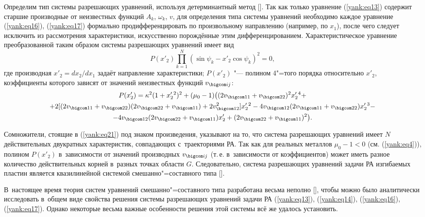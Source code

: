 Определим тип системы разрешающих уравнений, используя детерминантный метод []. 
Так как только уравнение (\ref{yank:eq13}) содержит старшие производные от неизвестных функций $A_k $, $\omega_k  $, $v$,  для определения типа системы уравнений необходимо каждое уравнение (\ref{yank:eq16}), (\ref{yank:eq17}) формально продифференцировать по произвольному направлению (например, по $x_1 $), после чего следует исключить из рассмотрения характеристики, искусственно порождённые этим дифференцированием. 
Характеристическое уравнение преобразованной таким образом системы разрешающих уравнений имеет вид
\begin{equation} \label{yank:eq21}
P( x'_2   )\prod\limits_{k=1}^N ( \sin \psi_k -x'_2  \cos \psi_k   )^2 =0,
\end{equation}
где производная $x'_2 =dx_2 /dx_1 $ задаёт направление характеристики; $P(x'_2 )$ "--- полином 4"=того порядка относительно $x'_2 $, коэффициенты которого зависят от значений неизвестных функций $v_{\bigcom ij}$:
\begin{multline} \label{yank:eq22}
P(x'_2 )=\kappa^2 (1+x'_2{} ^2)^2 +(\mu_0 -1)\bigl((2v_{\bigcom 11}+v_{\bigcom 22})^2 x'_2{}^4+ \\
+ 
2[(2v_{\bigcom 11}+v_{\bigcom 22}) (2v_{\bigcom 22}+v_{\bigcom 11})+2v_{\bigcom 12}^2 ]x'_2{}^2-4v_{\bigcom 12}(2v_{\bigcom 11}+v_{\bigcom 22})x'_2{} ^3-\\ - 4v_{\bigcom 12}(2v_{\bigcom 22}+v_{\bigcom 11})x'_{2}
+(2v_{\bigcom 22} +v_{\bigcom 11})^2 \bigr).
\end{multline}

Сомножители, стоящие в (\ref{yank:eq21}) под знаком произведения, указывают на то, что система разрешающих уравнений имеет $N$ действительных двукратных характеристик, совпадающих с~траекториями РА. 
Так как для реальных металлов $\mu_0 -1<0$ (см. (\ref{yank:eq4})),  полином $P(x'_2 )$ в~зависимости от значений производных $v_{\bigcom ij}$ (т.\,е. в~зависимости от коэффициентов) может иметь разное количество действительных корней в~разных точках области $G$. 
Следовательно, система разрешающих уравнений задачи РА изгибаемых пластин является квазилинейной системой смешанно"=составного типа [].

\smallskip

В~настоящее время теория систем уравнений смешанно"=составного типа разработана весьма неполно [], чтобы можно было аналитически исследовать в~общем виде свойства решения системы разрешающих уравнений задачи РА (\ref{yank:eq13}), (\ref{yank:eq14}), (\ref{yank:eq16}), (\ref{yank:eq17}). 
Однако некоторые весьма важные особенности решения этой системы всё же удалось установить.

